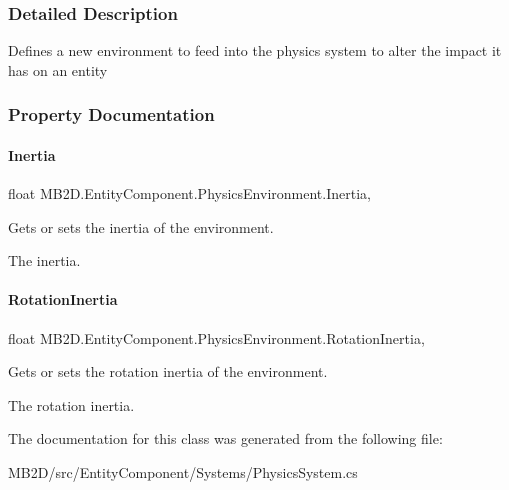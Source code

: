 \subsubsection{Detailed Description}
Defines a new environment to feed into the physics system to alter the impact it has on an entity 



\subsubsection{Property Documentation}
\hypertarget{class_m_b2_d_1_1_entity_component_1_1_physics_environment_a67ab743dbbe138e3eac38871e51c21d6}{}\label{class_m_b2_d_1_1_entity_component_1_1_physics_environment_a67ab743dbbe138e3eac38871e51c21d6} 
\paragraph{\texorpdfstring{Inertia}{Inertia}}
{\footnotesize\ttfamily float M\+B2\+D.\+Entity\+Component.\+Physics\+Environment.\+Inertia\hspace{0.3cm}{\ttfamily [get]}, {\ttfamily [set]}}



Gets or sets the inertia of the environment. 

The inertia.\hypertarget{class_m_b2_d_1_1_entity_component_1_1_physics_environment_a1c2fdbef41b7dee04b59200dd5d90cdc}{}\label{class_m_b2_d_1_1_entity_component_1_1_physics_environment_a1c2fdbef41b7dee04b59200dd5d90cdc} 
\paragraph{\texorpdfstring{Rotation\+Inertia}{RotationInertia}}
{\footnotesize\ttfamily float M\+B2\+D.\+Entity\+Component.\+Physics\+Environment.\+Rotation\+Inertia\hspace{0.3cm}{\ttfamily [get]}, {\ttfamily [set]}}



Gets or sets the rotation inertia of the environment. 

The rotation inertia.

The documentation for this class was generated from the following file\+:\begin{DoxyCompactItemize}
\item 
M\+B2\+D/src/\+Entity\+Component/\+Systems/Physics\+System.\+cs\end{DoxyCompactItemize}
